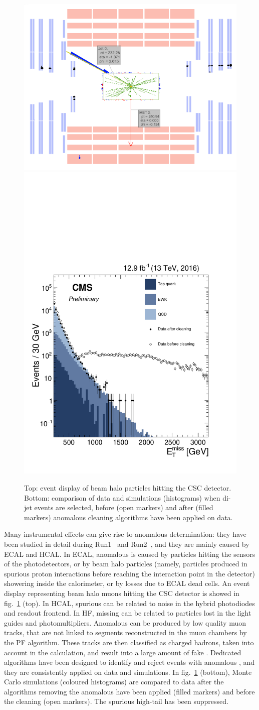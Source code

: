 \begin{figure}[!htb]
  \centering
    \includegraphics[width=.45\textwidth]{figures/MetPlots/BeamHalo_event_display.png}%
    \includegraphics[width=.35\textwidth]{figures/MetPlots/Filters.pdf}

  \caption{Top: event display of beam halo particles hitting the CSC detector. Bottom: comparison of data and simulations (histograms) when di-jet events are selected, before (open markers) and after (filled markers) anomalous \MET cleaning algorithms have been applied on data.}
  \label{fig:met_filters}
\end{figure}

\noindent Many instrumental effects can give rise to anomalous \MET determination: they have been studied in detail during Run1~\cite{Chatrchyan:2011tn,CMS:vgm} and Run2~\cite{CMS:2016ljj}, and they are mainly caused by ECAL and HCAL. In ECAL, anomalous \met is caused by particles hitting the sensors of the photodetectors, or by beam halo particles (namely, particles produced in spurious proton interactions before reaching the interaction point in the detector) showering inside the calorimeter, or by losses due to ECAL dead cells. An event display representing beam halo muons hitting the CSC detector is showed in fig.~\ref{fig:met_filters} (top). In HCAL, spurious \met can be related to noise in the hybrid photodiodes and readout frontend. In HF, missing \pt can be related to particles lost in the light guides and photomultipliers. Anomalous \MET can be produced by low quality muon tracks, that are not linked to segments reconstructed in the muon chambers by the PF algorithm. These tracks are then classified as charged hadrons, taken into account in the \met calculation, and result into a large amount of fake \MET. Dedicated algorithms have been designed to identify and reject events with anomalous \MET, and they are consistently applied on data and simulations. In fig.~\ref{fig:met_filters} (bottom), Monte Carlo simulations (coloured histograms) are compared to data after the algorithms removing the anomalous \MET have been applied (filled markers) and before the cleaning (open markers). The spurious high-\met tail has been suppressed.

